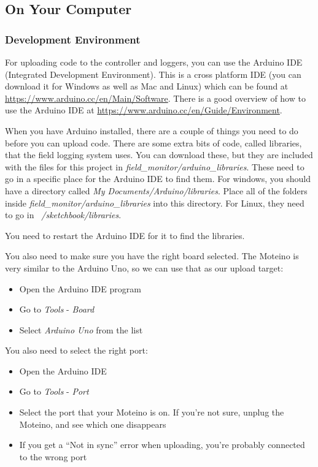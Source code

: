 \documentclass[10pt]{article}
\begin{document}
\subsection{On Your Computer}

\subsubsection{Development Environment}
For uploading code to the controller and loggers, you can use the Arduino IDE (Integrated Development Environment). This is a cross platform IDE (you can download it for
Windows as well as Mac and Linux) which can be found at \url{https://www.arduino.cc/en/Main/Software}. There is a good overview of how to use the Arduino IDE at
\url{https://www.arduino.cc/en/Guide/Environment}. 

When you have Arduino installed, there are a couple of things you need to do before you can upload code. There are some extra bits of code, called libraries, that the
field logging system uses. You can download these, but they are included with the files for this project in \textit{field\_monitor/arduino\_libraries}. These need to
go in a specific place for the Arduino IDE to find them. For windows, you should have a directory called \textit{My Documents/Arduino/libraries}. Place all of the folders
inside \textit{field\_monitor/arduino\_libraries} into this directory. For Linux, they need to go in \textit{~/sketchbook/libraries}. 

You need to restart the Arduino IDE for it to find the libraries.

You also need to make sure you have the right board selected. The Moteino is very similar to the Arduino Uno, so we can use that as our upload target:

\begin{itemize}
 \item Open the Arduino IDE program
 \item Go to \textit{Tools} - \textit{Board}
 \item Select \textit{Arduino Uno} from the list
\end{itemize}

You also need to select the right port:

\begin{itemize}
 \item Open the Arduino IDE 
 \item Go to \textit{Tools} - \textit{Port}
 \item Select the port that your Moteino is on. If you're not sure, unplug the Moteino, and see which one disappears
 \item If you get a ``Not in sync'' error when uploading, you're probably connected to the wrong port
\end{itemize}
\end{document}

